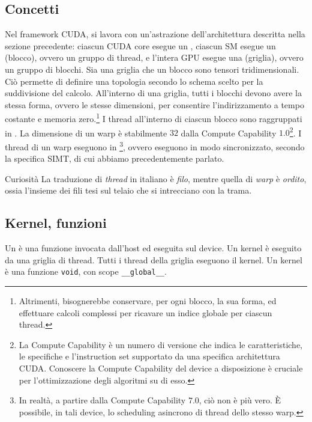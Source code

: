 \subsection{Concetti}
Nel framework CUDA, si lavora con un'astrazione dell'architettura descritta nella sezione precedente: ciascun CUDA core esegue un , ciascun SM esegue un  (blocco), ovvero un gruppo di thread, e l'intera GPU esegue una  (griglia), ovvero un gruppo di blocchi.
Sia una griglia che un blocco sono tensori tridimensionali.
Ciò permette di definire una topologia secondo lo schema scelto per la suddivisione del calcolo.
All'interno di una griglia, tutti i blocchi devono avere la stessa forma, ovvero le stesse dimensioni, per consentire l'indirizzamento a tempo costante e memoria zero.\footnote{Altrimenti, bisognerebbe conservare, per ogni blocco, la sua forma, ed effettuare calcoli complessi per ricavare un indice globale per ciascun thread.}
I thread all'interno di ciascun blocco sono raggruppati in .
La dimensione di un warp è stabilmente \(32\) dalla Compute Capability \(1.0\)\footnote{La Compute Capability è un numero di versione che indica le caratteristiche, le specifiche e l'instruction set supportato da una specifica architettura CUDA. Conoscere la Compute Capability del device a disposizione è cruciale per l'ottimizzazione degli algoritmi su di esso.}.
I thread di un warp eseguono in \footnote{In realtà, a partire dalla Compute Capability \(7.0\), ciò non è più vero. È possibile, in tali device, lo scheduling asincrono di thread dello stesso warp.}, ovvero eseguono in modo sincronizzato, secondo la specifica SIMT, di cui abbiamo precedentemente parlato.

\begin{observation}{Curiosità}
    La traduzione di \textit{thread} in italiano è \textit{filo}, mentre quella di \textit{warp} è \textit{ordito}, ossia l'insieme dei fili tesi sul telaio che si intrecciano con la trama.
\end{observation}

\subsection{Kernel, funzioni}
Un  è una funzione invocata dall'host ed eseguita sul device. Un kernel è eseguito da una griglia di thread. Tutti i thread della griglia eseguono il kernel.
Un kernel è una funzione \texttt{void}, con scope \texttt{\_\_global\_\_}.

